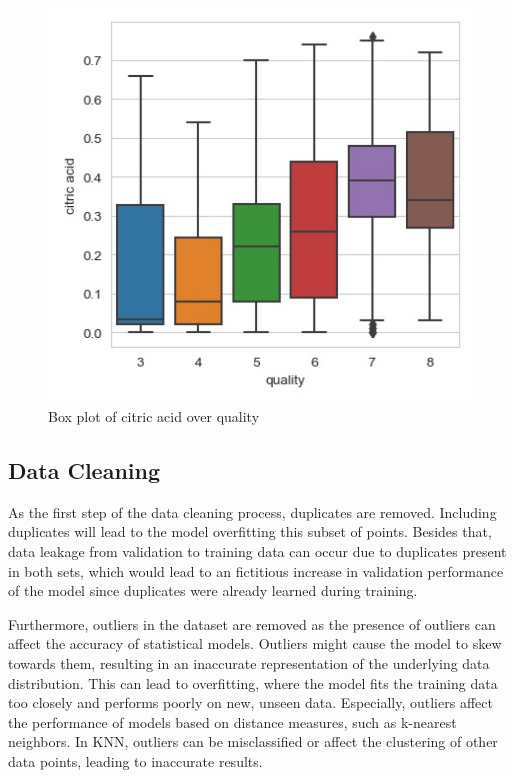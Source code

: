 \documentclass[conference]{IEEEtran}
\begin{document}
	\begin{figure}[h]
	\label{fig:foo}
	\begin{center}
	\includegraphics[scale=0.55]{c.jpg}
	\caption{Box plot of citric acid over quality}
	\end{center}
	\end{figure}
	
	




\subsection{Data Cleaning}

As the first step of the data cleaning process, duplicates are removed. Including duplicates will lead to the model overfitting this subset of points. Besides that, data leakage from validation to training data can occur  due to duplicates present in both sets, which would lead to an fictitious increase in validation performance of the model since duplicates were already learned during training.

Furthermore, outliers in the dataset are removed as the presence of outliers can affect the accuracy of statistical models. Outliers might cause the model to skew towards them, resulting in an inaccurate representation of the underlying data distribution. This can lead to overfitting, where the model fits the training data too closely and performs poorly on new, unseen data. Especially, outliers affect the performance of models based on distance measures, such as k-nearest neighbors. In KNN, outliers can be misclassified or affect the clustering of other data points, leading to inaccurate results.
\end{document}
